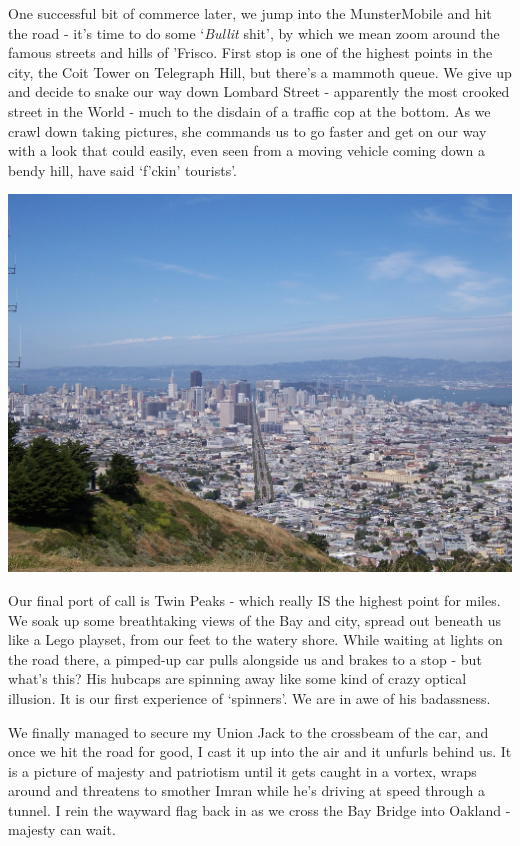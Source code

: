 \documentclass[a5paper,titlepage,11pt,draft]{book}
\begin{document}
One successful bit of commerce later, we jump into the MunsterMobile and hit the road - it's time to do some `\emph{Bullit} shit', by which we mean zoom around the famous streets and hills of 'Frisco.  First stop is one of the highest points in the city, the Coit Tower on Telegraph Hill, but there's a mammoth queue.  We give up and decide to snake our way down Lombard Street - apparently the most crooked street in the World - much to the disdain of a traffic cop at the bottom.  As we crawl down taking pictures, she commands us to go faster and get on our way with a look that could easily, even seen from a moving vehicle coming down a bendy hill, have said `f'ckin' tourists'.

\begin{center}\includegraphics[width=\textwidth]{gfx/100_1168}\end{center}

Our final port of call is Twin Peaks - which really IS the highest point for miles. We soak up some breathtaking views of the Bay and city, spread out beneath us like a Lego playset, from our feet to the watery shore.  While waiting at lights on the road there, a pimped-up car pulls alongside us and brakes to a stop - but what's this?  His hubcaps are spinning away like some kind of crazy optical illusion.  It is our first experience of `spinners'.  We are in awe of his badassness.

We finally managed to secure my Union Jack to the crossbeam of the car, and once we hit the road for good, I cast it up into the air and it unfurls behind us.  It is a picture of majesty and patriotism until it gets caught in a vortex, wraps around and threatens to smother Imran while he's driving at speed through a tunnel.  I rein the wayward flag back in as we cross the Bay Bridge into Oakland - majesty can wait.
\end{document}
